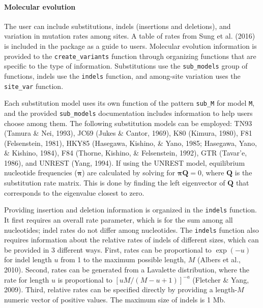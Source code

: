 \documentclass[12pt,]{article}
\let\oldparagraph\paragraph
\renewcommand{\paragraph}[1]{\oldparagraph{#1}\mbox{}}
\begin{document}
\hypertarget{molecular-evolution}{%
\paragraph{Molecular evolution}\label{molecular-evolution}}

The user can include substitutions, indels (insertions and deletions),
and variation in mutation rates among sites.
A table of rates from Sung et al. (2016) is included in the package
as a guide to users.
Molecular evolution information is provided to the \texttt{create\_variants}
function through organizing functions that are specific to the type of information.
Substitutions use the \texttt{sub\_models} group of functions,
indels use the \texttt{indels} function,
and among-site variation uses the \texttt{site\_var} function.

Each substitution model uses its own function of the pattern \texttt{sub\_M} for model \texttt{M},
and the provided \texttt{sub\_models} documentation includes information to help
users choose among them.
The following substitution models can be employed:
TN93 (Tamura \& Nei, 1993),
JC69 (Jukes \& Cantor, 1969),
K80 (Kimura, 1980),
F81 (Felsenstein, 1981),
HKY85 (Hasegawa, Kishino, \& Yano, 1985; Hasegawa, Yano, \& Kishino, 1984),
F84 (Thorne, Kishino, \& Felsenstein, 1992),
GTR (Tavar\a'e, 1986),
and UNREST (Yang, 1994).
If using the UNREST model, equilibrium nucleotide frequencies (\(\mathbf{\pi}\)) are
calculated by solving for \(\mathbf{\pi} \mathbf{Q} = 0\), where \(\mathbf{Q}\) is the
substitution rate matrix.
This is done by finding the left eigenvector of \(\mathbf{Q}\) that
corresponds to the eigenvalue closest to zero.

Providing insertion and deletion information is organized in the \texttt{indels} function.
It first requires an overall rate parameter, which is for the sum among all
nucleotides; indel rates do not differ among nucleotides.
The \texttt{indels} function also requires information about the relative rates of
indels of different sizes, which can be provided in 3 different ways.
First, rates can be proportional to \(\exp(-u)\) for indel length \(u\) from
1 to the maximum possible length, \(M\) (Albers et al., 2010).
Second, rates can be generated from a Lavalette distribution,
where the rate for length \(u\) is proportional to
\(\left[{u M / (M - u + 1)}\right]^{-a}\) (Fletcher \& Yang, 2009).
Third, relative rates can be specified directly by providing a length-\(M\)
numeric vector of positive values.
The maximum size of indels is 1 Mb.
\end{document}
